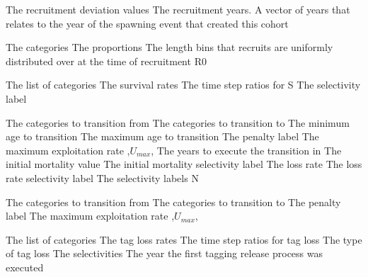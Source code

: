 {The recruitment deviation values}
 {The recruitment years. A vector of years that relates to the year of the spawning event that created this cohort}
\par\textbf{}\par
{} {The categories}
 {The proportions}
 {The length bins that recruits are uniformly distributed over at the time of recruitment}
 {R0}
\par\textbf{}\par
{} {The list of categories}
 {The survival rates}
 {The time step ratios for S}
 {The selectivity label}
\par\textbf{}\par
{} {The categories to transition from}
 {The categories to transition to}
 {The minimum age to transition}
 {The maximum age to transition}
 {The penalty label}
 {The maximum exploitation rate ,$U_{max}$,}
 {The years to execute the transition in}
 {The initial mortality value}
 {The initial mortality selectivity label}
 {The loss rate}
 {The loss rate selectivity label}
 {The selectivity labels}
 {N}
\par\textbf{}\par
{} {The categories to transition from}
 {The categories to transition to}
 {The penalty label}
 {The maximum exploitation rate ,$U_{max}$,}
 {}
 {}
 {}
 {}
\par\textbf{}\par
{} {The list of categories}
 {The tag loss rates}
 {The time step ratios for tag loss}
 {The type of tag loss}
 {The selectivities}
 {The year the first tagging release process was executed}

